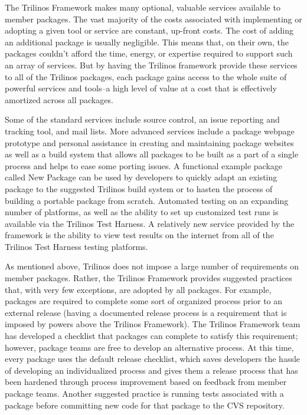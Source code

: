 \documentclass[12pt,relax]{article}
\begin{document}
The Trilinos Framework makes many optional, valuable services available to
member packages.  The vast majority of the costs associated with implementing
or adopting a given tool or service are constant, up-front costs.  The cost of
adding an additional package is usually negligible.  This means that, on their
own, the packages couldn't afford the time, energy, or expertise required to
support such an array of services.  But by having the Trilinos framework
provide these services to all of the Trilinos packages, each package gains
access to the whole suite of powerful services and tools--a high level of value
at a cost that is effectively amortized across all packages.

Some of the standard services include source control, an issue reporting and
tracking tool, and mail lists.  More advanced services include a package
webpage prototype and personal assistance in creating and maintaining package
websites as well as a build system that allows all packages to be built as a
part of a single process and helps to ease some porting issues.  A functional
example package called New Package can be used by developers to quickly adapt
an existing package to the suggested Trilinos build system or to hasten the
process of building a portable package from scratch.  Automated testing on an
expanding number of platforms, as well as the ability to set up customized test
runs is available via the Trilinos Test Harness.  A relatively new service
provided by  the framework is the ability to view test results on the internet
from all of the Trilinos Test Harness testing platforms.

As mentioned above, Trilinos does not impose a large number of requirements
on member packages.  Rather, the Trilinos Framework provides suggested 
practices that, with very few exceptions, are adopted by all packages.
For example, packages are required to complete some sort of organized
process prior to an external release (having a documented release
process is a requirement that is imposed by powers above the Trilinos
Framework).  The Trilinos Framework team has developed a checklist that
packages can complete to satisfy this requirement; however, package teams
are free to develop an alternative process.  At this time, every package
uses the default release checklist, which saves developers the hassle of
developing an individualized process and gives them a release process that
has been hardened through process improvement based on feedback from
member package teams.  Another suggested practice is running tests
associated with a package before committing new code for that package to the 
CVS repository.
\end{document}
